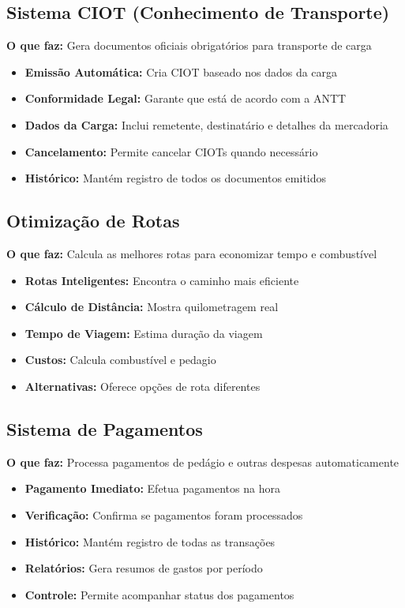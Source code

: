 \documentclass[12pt,a4paper]{article}
\begin{document}
\subsection{Sistema CIOT (Conhecimento de Transporte)}
\textbf{O que faz:} Gera documentos oficiais obrigatórios para transporte de carga
\begin{itemize}
    \item \textbf{Emissão Automática:} Cria CIOT baseado nos dados da carga
    \item \textbf{Conformidade Legal:} Garante que está de acordo com a ANTT
    \item \textbf{Dados da Carga:} Inclui remetente, destinatário e detalhes da mercadoria
    \item \textbf{Cancelamento:} Permite cancelar CIOTs quando necessário
    \item \textbf{Histórico:} Mantém registro de todos os documentos emitidos
\end{itemize}

\subsection{Otimização de Rotas}
\textbf{O que faz:} Calcula as melhores rotas para economizar tempo e combustível
\begin{itemize}
    \item \textbf{Rotas Inteligentes:} Encontra o caminho mais eficiente
    \item \textbf{Cálculo de Distância:} Mostra quilometragem real
    \item \textbf{Tempo de Viagem:} Estima duração da viagem
    \item \textbf{Custos:} Calcula combustível e pedagio
    \item \textbf{Alternativas:} Oferece opções de rota diferentes
\end{itemize}

\subsection{Sistema de Pagamentos}
\textbf{O que faz:} Processa pagamentos de pedágio e outras despesas automaticamente
\begin{itemize}
    \item \textbf{Pagamento Imediato:} Efetua pagamentos na hora
    \item \textbf{Verificação:} Confirma se pagamentos foram processados
    \item \textbf{Histórico:} Mantém registro de todas as transações
    \item \textbf{Relatórios:} Gera resumos de gastos por período
    \item \textbf{Controle:} Permite acompanhar status dos pagamentos
\end{itemize}
\end{document}

